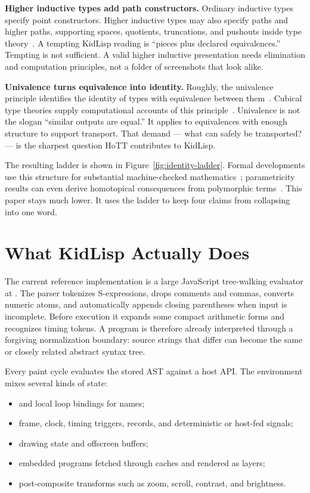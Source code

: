 \documentclass[10pt,letterpaper,twocolumn]{article}
\newcommand{\code}[1]{\texttt{\detokenize{#1}}}
\begin{document}
\textbf{Higher inductive types add path constructors.} Ordinary inductive types specify point constructors. Higher inductive types may also specify paths and higher paths, supporting spaces, quotients, truncations, and pushouts inside type theory~\citep{sojakova2015hits,lumsdaine2020hits}. A tempting KidLisp reading is ``pieces plus declared equivalences.'' Tempting is not sufficient. A valid higher inductive presentation needs elimination and computation principles, not a folder of screenshots that look alike.

\textbf{Univalence turns equivalence into identity.} Roughly, the univalence principle identifies the identity of types with equivalence between them~\citep{hottbook2013}. Cubical type theories supply computational accounts of this principle~\citep{cohen2017cubical}. Univalence is not the slogan ``similar outputs are equal.'' It applies to equivalences with enough structure to support transport. That demand --- what can safely be transported? --- is the sharpest question HoTT contributes to KidLisp.

The resulting ladder is shown in Figure~\ref{fig:identity-ladder}. Formal developments use this structure for substantial machine-checked mathematics~\citep{hou2016blakers}; parametricity results can even derive homotopical consequences from polymorphic terms~\citep{uemura2017homotopies}. This paper stays much lower. It uses the ladder to keep four claims from collapsing into one word.

\section{What KidLisp Actually Does}
\label{sec:runtime}

The current reference implementation is a large JavaScript tree-walking evaluator at . The parser tokenizes S-expressions, drops comments and commas, converts numeric atoms, and automatically appends closing parentheses when input is incomplete. Before execution it expands some compact arithmetic forms and recognizes timing tokens. A program is therefore already interpreted through a forgiving normalization boundary: source strings that differ can become the same or closely related abstract syntax tree.

Every paint cycle evaluates the stored AST against a host API. The environment mixes several kinds of state:

\begin{itemize}
\item \code{globalDef} and local loop bindings for names;
\item frame, clock, timing triggers, \code{once} records, and deterministic or host-fed signals;
\item drawing state and offscreen buffers;
\item embedded \code{$code} programs fetched through caches and rendered as layers;
\item post-composite transforms such as zoom, scroll, contrast, and brightness.
\end{itemize}
\end{document}
